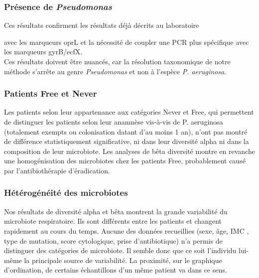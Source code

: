 \documentclass[12pt,a4paper]{article}
\begin{document}
\subsubsection{Présence de \textit{Pseudomonas}}

Ces résultats confirment les résultats déjà décrits au laboratoire{\cite{LeGall} avec les marqueurs oprL et la nécessité de coupler une PCR plus spécifique avec les marqueurs gyrB/ecfX. \\
Ces résultats doivent être nuancés, car la résolution taxonomique de notre méthode s'arrête au genre \textit{Pseudomonas} et non à l'espèce \textit{P. aeruginosa}.

\subsubsection{Patients Free et Never}
Les patients selon leur appartenance aux catégories Never et Free\cite{Lee2003}, qui permettent de distinguer les patients selon leur anamnèse vis-à-vis de P. aeruginosa (totalement exempts ou colonisation datant d'au moins 1 an), n'ont pas montré de différence statistiquement significative, ni dans leur diversité alpha ni dans la composition de leur microbiote. Les analyses de bêta diversité montre en revanche une homogénisation des microbiotes chez les patients Free, probablement causé par l'antibiothérapie d'éradication.
 
\subsubsection{Hétérogénéité des microbiotes}
Nos résultats de diversité alpha et bêta montrent la grande variabilité du microbiote respiratoire. Ils sont différents entre les patients et changent rapidement au cours du temps. Aucune des données recueillies (sexe, âge, IMC , type de mutation, score cytologique, prise d'antibiotique) n'a permis de distinguer des catégories de microbiote. Il semble donc que ce soit l'individu lui-même la principale source de variabilité. La proximité, sur le graphique d'ordination, de certains échantillons d'un même patient va dans ce sens. 

}
\end{document}
